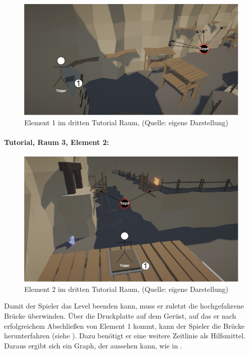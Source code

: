 \begin{figure}[ht]
\centering
\includegraphics[width=0.8\linewidth]{content/pictures/Raetsel-L01_R03_R01.jpg}
\caption{Element 1 im dritten Tutorial Raum, (Quelle: eigene Darstellung)}
\label{fig:L01_R03_R01}
\end{figure}

\paragraph{Tutorial, Raum 3, Element 2:}

\begin{figure}[ht]
\centering
\includegraphics[width=0.8\linewidth]{content/pictures/Raetsel-L01_R03_R02.jpg}
\caption{Element 2 im dritten Tutorial Raum, (Quelle: eigene Darstellung)}
\label{fig:L01_R03_R02}
\end{figure}

Damit der Spieler das Level beenden kann, muss er zuletzt die hochgefahrene Brücke überwinden. Über die Druckplatte auf dem Gerüst, auf das er nach erfolgreichem Abschließen von Element 1 kommt, kann der Spieler die Brücke herunterfahren (siehe ). Dazu benötigt er eine weitere Zeitlinie als Hilfsmittel. Daraus ergibt sich ein Graph, der aussehen kann, wie in .

